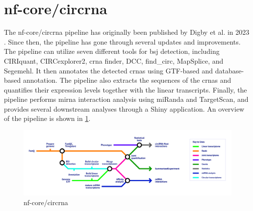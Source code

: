 \section{nf-core/circrna}
\label{sec:nf-core_circrna}
The nf-core/circrna pipeline has originally been published by Digby et al.
in
2023 \supercite{digby_nf-corecircrna_2023}.
Since then, the pipeline has gone through several updates and improvements.
The pipeline can utilize seven different tools for \gls{bsj} detection,
including CIRIquant, CIRCexplorer2, \gls{crna} finder, DCC, find\_circ,
MapSplice, and Segemehl.
It then annotates the detected \gls{crna}s using GTF-based and database-based
annotation.
The pipeline also extracts the sequences of the \gls{crna}s and quantifies
their expression levels together with the linear transcripts.
Finally, the pipeline performs \gls{mirna} interaction analysis using miRanda
and TargetScan, and provides several downstream analyses through a Shiny
application.
An overview of the pipeline is shown in \cref{fig:circrna_pipeline}.

\begin{figure}[ht]
    \centering

    \includegraphics[width=\textwidth]{chapters/3_materials_and_methods/figures/nf-core_circrna.png}
    \caption{nf-core/circrna} %
    \label{fig:circrna_pipeline}
\end{figure}





